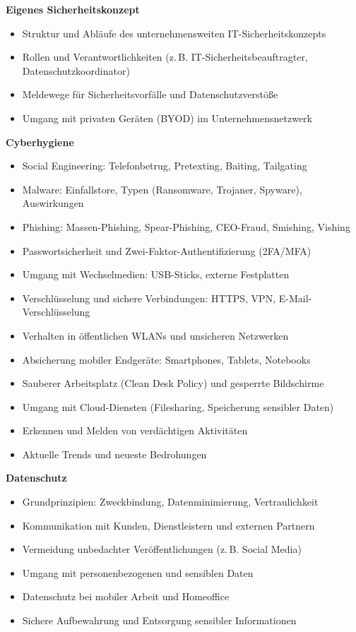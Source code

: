 \textbf{Eigenes Sicherheitskonzept}
\begin{itemize}
    \item Struktur und Abläufe des unternehmensweiten IT-Sicherheitskonzepts
    \item Rollen und Verantwortlichkeiten (z.\,B. IT-Sicherheitsbeauftragter, Datenschutzkoordinator)
    \item Meldewege für Sicherheitsvorfälle und Datenschutzverstöße
    \item Umgang mit privaten Geräten (BYOD) im Unternehmensnetzwerk
\end{itemize}

\textbf{Cyberhygiene}
\begin{itemize}
    \item Social Engineering: Telefonbetrug, Pretexting, Baiting, Tailgating
    \item Malware: Einfallstore, Typen (Ransomware, Trojaner, Spyware), Auswirkungen
    \item Phishing: Massen-Phishing, Spear-Phishing, CEO-Fraud, Smishing, Vishing
    \item Passwortsicherheit und Zwei-Faktor-Authentifizierung (2FA/MFA)
    \item Umgang mit Wechselmedien: USB-Sticks, externe Festplatten
    \item Verschlüsselung und sichere Verbindungen: HTTPS, VPN, E-Mail-Verschlüsselung
    \item Verhalten in öffentlichen WLANs und unsicheren Netzwerken
    \item Absicherung mobiler Endgeräte: Smartphones, Tablets, Notebooks
    \item Sauberer Arbeitsplatz (Clean Desk Policy) und gesperrte Bildschirme
    \item Umgang mit Cloud-Diensten (Filesharing, Speicherung sensibler Daten)
    \item Erkennen und Melden von verdächtigen Aktivitäten
    \item Aktuelle Trends und neueste Bedrohungen
\end{itemize}

\textbf{Datenschutz}
\begin{itemize}
    \item Grundprinzipien: Zweckbindung, Datenminimierung, Vertraulichkeit
    \item Kommunikation mit Kunden, Dienstleistern und externen Partnern
    \item Vermeidung unbedachter Veröffentlichungen (z.\,B. Social Media)
    \item Umgang mit personenbezogenen und sensiblen Daten
    \item Datenschutz bei mobiler Arbeit und Homeoffice
    \item Sichere Aufbewahrung und Entsorgung sensibler Informationen
\end{itemize}
\newpage


